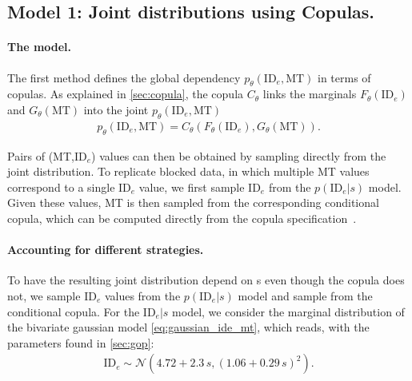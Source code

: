 \documentclass[acmlarge, manuscript,review]{acmart}
\newcommand{\mt}{\ensuremath{{\text{MT}}}\xspace}
\newcommand{\ide}{\ensuremath{{\text{ID}_e}}\xspace}
\begin{document}
\subsection{Model 1: Joint distributions using Copulas.\label{sub:model1}}

\paragraph{The model.} The first method defines the global dependency $p_{\theta}(\ide, \mt)$ in terms of copulas. As explained in \autoref{sec:copula}, the copula $C_{\theta}$ links the marginals $F_{\theta}(\ide)$ and $G_{\theta}(\mt)$ into the joint $p_{\theta}(\ide, \mt)$
\begin{align}
  p_{\theta}(\ide, \mt) = C_{\theta}(F_{\theta}(\ide), G_{\theta}(\mt)).
\end{align}

Pairs of (MT,\ide) values can then be obtained by sampling directly from the joint distribution. To replicate blocked data, in which multiple MT values correspond to a single \ide value, we first sample \ide from the $p(\ide|s)$ model. Given these values, MT is then sampled from the corresponding conditional copula, which can be computed directly from the copula specification~\cite{nelsen2006}.

\paragraph{Accounting for different strategies.} To have the resulting joint distribution depend on s even though the copula does not, we sample \ide values from the $p(\ide | s)$ model and sample from the conditional copula.
For the $\ide|s$ model, we consider the marginal distribution of the bivariate gaussian model \autoref{eq:gaussian_ide_mt}, which reads, with the parameters found in \autoref{sec:gop}:
\begin{align}
  \ide \sim \mathcal{N}(4.72 + 2.3\,s, (1.06 + 0.29\,s)^2). \label{eq:gauss_strategy_marginal}
\end{align}
\end{document}

